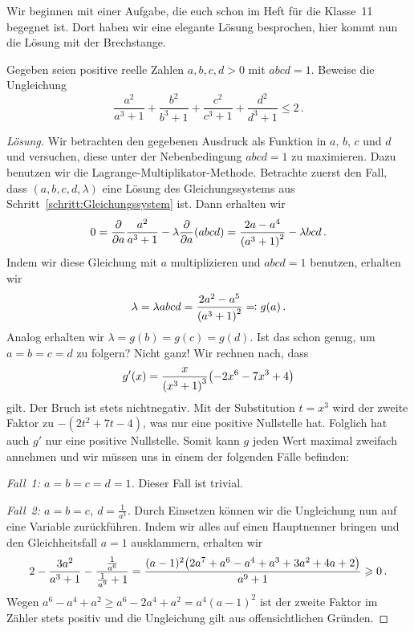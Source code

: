 Wir beginnen mit einer Aufgabe, die euch schon im Heft für die Klasse~11 begegnet ist. Dort haben wir eine elegante Lösung besprochen, hier kommt nun die Lösung mit der Brechstange.
\begin{aufgabe*}\label{aufgabe:AIMO2014}
	Gegeben seien positive reelle Zahlen $a,b,c,d>0$ mit $abcd=1$. Beweise die Ungleichung
	\begin{equation*}
		\frac{a^2}{a^3+1}+\frac{b^2}{b^3+1}+\frac{c^2}{c^3+1}+\frac{d^2}{d^3+1}\leqslant 2\,.
	\end{equation*}
\end{aufgabe*}
\begin{proof}[Lösung]
	Wir betrachten den gegebenen Ausdruck als Funktion in $a$, $b$, $c$ und $d$ und versuchen, diese unter der Nebenbedingung $abcd=1$ zu maximieren. Dazu benutzen wir die Lagrange-Multiplikator-Methode. Betrachte zuerst den Fall, dass $(a,b,c,d,\lambda)$ eine Lösung des Gleichungssystems aus Schritt~\ref{schritt:Gleichungssystem} ist. Dann erhalten wir
	\begin{equation*}
		0=\frac{\partial}{\partial a}\frac{a^2}{a^3+1}-\lambda\frac{\partial}{\partial a}(abcd)=\frac{2a-a^4}{\parens*{a^3+1}^2}-\lambda bcd\,.
	\end{equation*}
	Indem wir diese Gleichung mit $a$ multiplizieren und $abcd=1$ benutzen, erhalten wir
	\begin{equation*}
		\lambda=\lambda abcd=\frac{2a^2-a^5}{\parens*{a^3+1}^2}\eqqcolon g(a)\,.
	\end{equation*}
	Analog erhalten wir $\lambda=g(b)=g(c)=g(d)$. Ist das schon genug, um $a=b=c=d$ zu folgern? Nicht ganz! Wir rechnen nach, dass
	\begin{equation*}
		g'(x)=\frac{x}{\parens*{x^3+1}^3}\parens*{-2x^6-7x^3+4}
	\end{equation*}
	gilt. Der Bruch ist stets nichtnegativ. Mit der Substitution $t=x^3$ wird der zweite Faktor zu $-(2t^2+7t-4)$, was nur eine positive Nullstelle hat. Folglich hat auch $g'$ nur eine positive Nullstelle. Somit kann $g$ jeden Wert maximal zweifach annehmen und wir müssen uns in einem der folgenden Fälle befinden:
	
	\emph{Fall~1: $a=b=c=d=1$.} Dieser Fall ist trivial.
	
	\emph{Fall~2: $a=b=c$, $d=\frac1{a^3}$.} Durch Einsetzen können wir die Ungleichung nun auf eine Variable zurückführen. Indem wir alles auf einen Hauptnenner bringen und den Gleichheitsfall $a=1$ ausklammern, erhalten wir
	\begin{equation*}
		2-\frac{3a^2}{a^3+1}-\frac{\frac{1}{a^6}}{\frac1{a^9}+1}=\frac{(a-1)^2\parens*{2a^7+a^6-a^4+a^3+3a^2+4a+2}}{a^9+1}\geqslant 0\,.
	\end{equation*}
	Wegen $a^6-a^4+a^2\geqslant a^6-2a^4+a^2=a^4(a-1)^2$ ist der zweite Faktor im Zähler stets positiv und die Ungleichung gilt aus offensichtlichen Gründen.
	

\end{proof}
